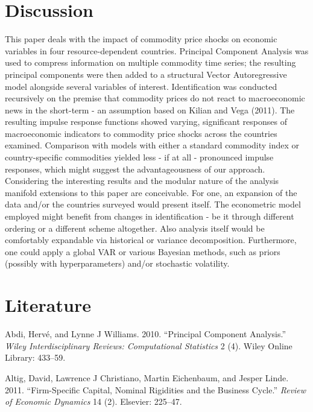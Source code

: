\documentclass[12pt,]{article}
\begin{document}
\section{Discussion}\label{discussion}

This paper deals with the impact of commodity price shocks on economic
variables in four resource-dependent countries. Principal Component
Analysis was used to compress information on multiple commodity time
series; the resulting principal components were then added to a
structural Vector Autoregressive model alongside several variables of
interest. Identification was conducted recursively on the premise that
commodity prices do not react to macroeconomic news in the short-term -
an assumption based on Kilian and Vega (2011). The resulting impulse
response functions showed varying, significant responses of
macroeconomic indicators to commodity price shocks across the countries
examined. Comparison with models with either a standard commodity index
or country-specific commodities yielded less - if at all - pronounced
impulse responses, which might suggest the advantageousness of our
approach.\\
Considering the interesting results and the modular nature of the
analysis manifold extensions to this paper are conceivable. For one, an
expansion of the data and/or the countries surveyed would present
itself. The econometric model employed might benefit from changes in
identification - be it through different ordering or a different scheme
altogether. Also analysis itself would be comfortably expandable via
historical or variance decomposition. Furthermore, one could apply a
global VAR or various Bayesian methods, such as priors (possibly with
hyperparameters) and/or stochastic volatility.

\newpage

\section{Literature}\label{literature}

\hypertarget{refs}{}
\hypertarget{ref-abdi2010principal}{}
Abdi, Hervé, and Lynne J Williams. 2010. ``Principal Component
Analysis.'' \emph{Wiley Interdisciplinary Reviews: Computational
Statistics} 2 (4). Wiley Online Library: 433--59.

\hypertarget{ref-altig2011firm}{}
Altig, David, Lawrence J Christiano, Martin Eichenbaum, and Jesper
Linde. 2011. ``Firm-Specific Capital, Nominal Rigidities and the
Business Cycle.'' \emph{Review of Economic Dynamics} 14 (2). Elsevier:
225--47.
\end{document}
